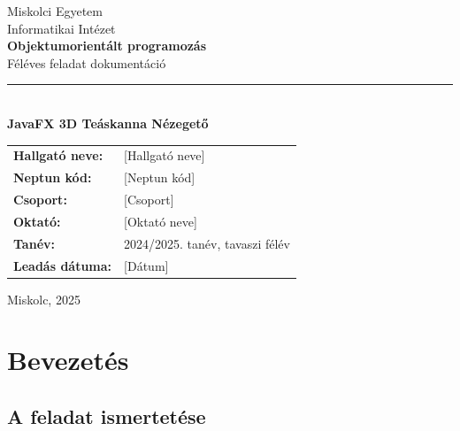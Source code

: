 \documentclass[12pt,a4paper]{article}
\begin{document}

\begin{titlepage}
  \centering
  \vspace*{1.8cm}

  {\large Miskolci Egyetem}\\[0.4cm]
  {\large Informatikai Intézet}\\[2.2cm]

  {\LARGE\bfseries Objektumorientált programozás}\\[0.6cm]
  {\Large Féléves feladat dokumentáció}\\[1.6cm]

  \rule{0.55\textwidth}{0.5pt}\\[1.4cm]

  {\Large\bfseries JavaFX 3D Teáskanna Nézegető}\\[2.4cm]

  \begin{tabular}{ll}
    \textbf{Hallgató neve:} & {[Hallgató neve]}               \\[0.35cm]
    \textbf{Neptun kód:}    & {[Neptun kód]}                  \\[0.35cm]
    \textbf{Csoport:}       & {[Csoport]}                     \\[0.35cm]
    \textbf{Oktató:}        & {[Oktató neve]}                 \\[0.35cm]
    \textbf{Tanév:}         & 2024/2025. tanév, tavaszi félév \\[0.35cm]
    \textbf{Leadás dátuma:} & {[Dátum]}                       \\
  \end{tabular}

  \vfill
  {\small Miskolc, 2025}
\end{titlepage}

\tableofcontents
\newpage

\section{Bevezetés}

\subsection{A feladat ismertetése}
\end{document}
